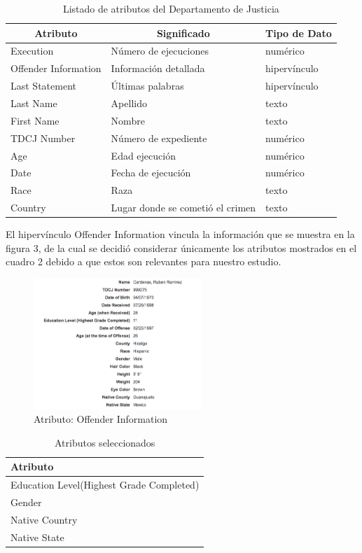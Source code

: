 \documentclass[sigconf]{acmart}
\begin{document}
\begin{table}[ht]
\centering
\begin{tabular}{|l|l|l|}
\hline
\multicolumn{1}{|c|}{Atributo} & \multicolumn{1}{c|}{Significado} & \multicolumn{1}{c|}{Tipo de Dato} \\
\hline
Execution & Número de ejecuciones & numérico \\ 
\hline
Offender Information & Información detallada & hipervínculo \\ 
\hline
Last Statement & Últimas palabras & hipervínculo \\ 
\hline
Last Name & Apellido & texto \\ 
\hline
First Name & Nombre & texto \\ 
\hline
TDCJ Number & Número de expediente & numérico \\ 
\hline
Age & Edad ejecución & numérico \\ 
\hline
Date & Fecha de ejecución & numérico \\ 
\hline
Race & Raza & texto \\ 
\hline
Country & Lugar donde se cometió el crimen & texto \\ 
\hline
\end{tabular}
\caption{Listado de atributos del Departamento de Justicia}
\label{my-label}
\end{table}

El hipervínculo Offender Information vincula la información que se muestra en la figura 3, de la cual se decidió considerar únicamente los atributos mostrados en el cuadro 2 debido a que estos son relevantes para nuestro estudio.


\begin{figure}[ht]
  \centering
  \includegraphics[width=2.5in]{datos.png}
  \caption{Atributo: Offender Information}
\end{figure}

\begin{table}[!hbt]
\begin{center}
\begin{tabular}{|l|}
\hline
Atributo\\
\hline
Education Level(Highest Grade Completed)\\
Gender\\
Native Country\\
Native State\\
\hline
\end{tabular}
\caption{Atributos seleccionados}
\end{center}
\end{table}
\end{document}
